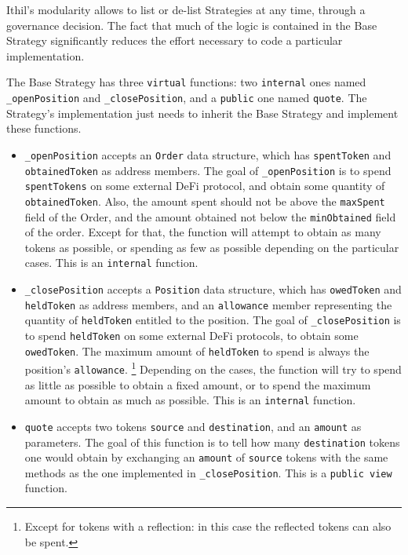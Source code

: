 \documentclass[a4paper,10 pt]{article}
\theoremstyle{definition}
\begin{document}
Ithil's modularity allows to list or de-list Strategies at any time, through a governance decision. The fact that much of the logic is contained in the Base Strategy significantly reduces the effort necessary to code a particular implementation.

The Base Strategy has three \verb|virtual| functions: two \verb|internal| ones named \verb|_openPosition| and \verb|_closePosition|, and a \verb|public| one named \verb|quote|. The Strategy's implementation just needs to inherit the Base Strategy and implement these functions.

\begin{itemize}
\item \verb|_openPosition| accepts an \verb|Order| data structure, which has \verb|spentToken| and \verb|obtainedToken| as address members. The goal of \verb|_openPosition| is to spend \verb|spentTokens| on some external DeFi protocol, and obtain some quantity of \verb|obtainedToken|. Also, the amount spent should not be above the \verb|maxSpent| field of the Order, and the amount obtained not below the \verb|minObtained| field of the order. Except for that, the function will attempt to obtain as many tokens as possible, or spending as few as possible depending on the particular cases. This is an \verb|internal| function.
\item \verb|_closePosition| accepts a \verb|Position| data structure, which has \verb|owedToken| and \verb|heldToken| as address members, and an \verb|allowance| member representing the quantity of \verb|heldToken| entitled to the position. The goal of \verb|_closePosition| is to spend \verb|heldToken| on some external DeFi protocols, to obtain some \verb|owedToken|. The maximum amount of \verb|heldToken| to spend is always the position's \verb|allowance|. \footnote{Except for tokens with a reflection: in this case the reflected tokens can also be spent.} Depending on the cases, the function will try to spend as little as possible to obtain a fixed amount, or to spend the maximum amount to obtain as much as possible. This is an \verb|internal| function.
\item \verb|quote| accepts two tokens \verb|source| and \verb|destination|, and an \verb|amount| as parameters. The goal of this function is to tell how many \verb|destination| tokens one would obtain by exchanging an \verb|amount| of \verb|source| tokens with the same methods as the one implemented in \verb|_closePosition|. This is a \verb|public view| function.
\end{itemize}
\end{document}
